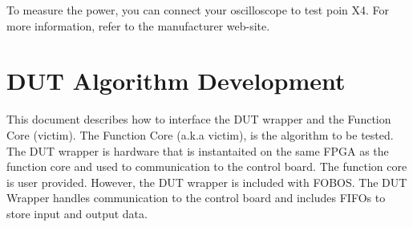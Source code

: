 \documentclass[letterpaper,10pt,english]{sphinxmanual}
\begin{document}
\begin{sphinxVerbatim}[commandchars=\\\{\}]
\end{sphinxVerbatim}

To measure the power, you can connect your oscilloscope to test poin X4. For more information,
refer to the manufacturer web-site.


\chapter{DUT Algorithm Development}
\label{\detokenize{dutdev:dut-algorithm-development}}\label{\detokenize{dutdev::doc}}
This document describes how to interface the DUT wrapper and the Function Core (victim).
The  Function Core (a.k.a victim), is the algorithm to be tested. The DUT wrapper is hardware that is instantaited on the same
FPGA as the function core and used to communication to the control board.
The function core is user provided. However, the DUT wrapper is included with FOBOS.
The DUT Wrapper handles communication to the control board and includes FIFOs to store input and output data.
\end{document}
